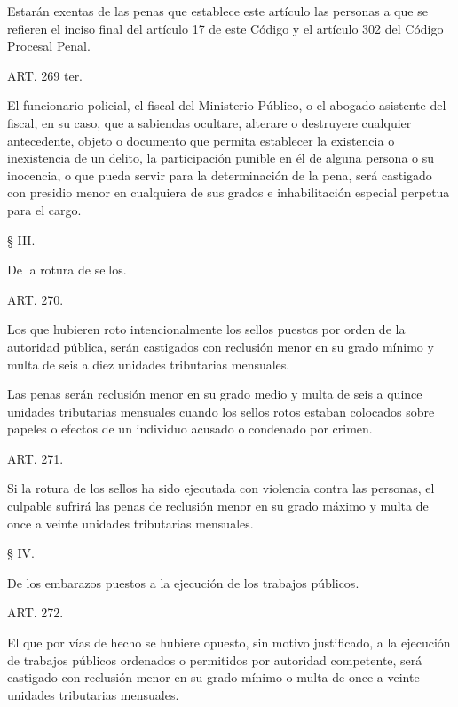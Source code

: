     Estarán exentas de las penas que establece este artículo las personas a que se refieren el inciso final del artículo 17 de este Código y el artículo 302 del Código Procesal Penal.



    ART. 269 ter.

    El funcionario policial, el fiscal del Ministerio Público, o el abogado asistente del fiscal, en su caso, que a sabiendas ocultare, alterare o destruyere cualquier antecedente, objeto o documento que permita establecer la existencia o inexistencia de un delito, la participación punible en él de alguna persona o su inocencia, o que pueda servir para la determinación de la pena, será castigado con presidio menor en cualquiera de sus grados e inhabilitación especial perpetua para el cargo.




    § III.

    De la rotura de sellos.





    ART. 270.

    Los que hubieren roto intencionalmente los sellos puestos por orden de la autoridad pública, serán castigados con reclusión menor en su grado mínimo y multa de seis a diez unidades tributarias mensuales.

    Las penas serán reclusión menor en su grado medio y multa de seis a quince unidades tributarias mensuales cuando los sellos rotos estaban colocados sobre papeles o efectos de un individuo acusado o condenado por crimen.



    ART. 271.

    Si la rotura de los sellos ha sido ejecutada con violencia contra las personas, el culpable sufrirá las penas de reclusión menor en su grado máximo y multa de once a veinte unidades tributarias mensuales.








    § IV.

    De los embarazos puestos a la ejecución de los trabajos públicos.





    ART. 272.

    El que por vías de hecho se hubiere opuesto, sin motivo justificado, a la ejecución de trabajos públicos ordenados o permitidos por autoridad competente, será castigado con reclusión menor en su grado mínimo o multa de once a veinte unidades tributarias mensuales.








